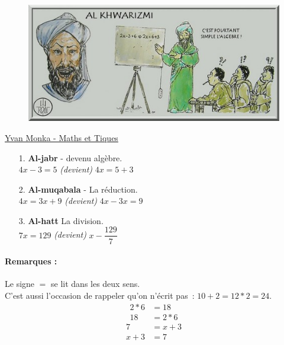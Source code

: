 \documentclass[11pt]{article}
\begin{document}
\begin{figure}[H]
        \centering
        \includegraphics[width=0.5\linewidth]{3x11-equations/al.png}
\end{figure}
\begin{center}
    \href{https://www.maths-et-tiques.fr/index.php/histoire-des-maths/mathematiciens-celebres/al-khwarizmi}{Yvan Monka - Maths et Tiques}
\end{center}
\begin{multicols}{3}
\begin{enumerate}
    \item[1.] \textbf{Al-jabr} - devenu algèbre.\\
    $4x - 3 = 5$ \textit{(devient)} \newline
    $4x = 5 + 3$ \columnbreak
    \item[2.] \textbf{Al-muqabala} - La réduction. \\
    $4x = 3x + 9$ \textit{(devient)} \newline
    $4x - 3x = 9$ \columnbreak
    \item[3.] \textbf{Al-hatt} La division. \\
    $7x = 129$ \textit{(devient)} \newline
    $x - \dfrac{129}{7}$ 
\end{enumerate}
\end{multicols}

\begin{multicols}{2}
\paragraph{Remarques : } Le signe $=$ se lit dans les deux sens. \\
C’est aussi l’occasion de rappeler qu'on n’écrit pas : $10 + 2 = 12 * 2 = 24$. \columnbreak
    \begin{align*}
        2*6 &= 18  \\
        18 &= 2*6
    \end{align*}
    \begin{align*}        
        7 &= x + 3 \\
        x + 3 &= 7
    \end{align*}
\end{multicols}
\end{document}
